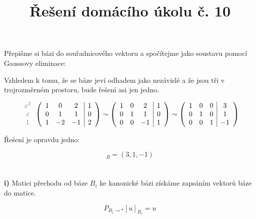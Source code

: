 \documentclass[10pt,a4paper]{article}
\title{Řešení domácího úkolu č. 10}
\date{}
\begin{document}
\maketitle

\section{} 

Přepišme si bázi do souřadnicového vektoru a spočítejme jako soustavu pomocí Gaussovy eliminace:


Vzhledem k tomu, že se báze jeví odhadem jako nezávislé a že jsou tři v trojrozměrném prostoru, bude řešení asi jen jedno.

\begin{equation*}
\color{gray}
\begin{array}{c}
x^2 \\ x \\ 1
\end{array}
\color{black}
\left(
\begin{array}{ccc|c}
1 & 0 & 2 & 1\\
0 & 1 & 1 & 0 \\
1 & -2 & -1 & 2 
\end{array}
\right)
\sim
\left(
\begin{array}{ccc|c}
1 & 0 & 2 & 1\\
0 & 1 & 1 & 0 \\
0 & 0 & -1 & 1 
\end{array}
\right)
\sim
\left(
\begin{array}{ccc|c}
1 & 0 & 0 & 3\\
0 & 1 & 0 & 1 \\
0 & 0 & 1&  -1 
\end{array}
\right)
\end{equation*}

Řešení je opravdu jedno:

\begin{equation*}
[x^2 + 2]_B = (3, 1 , -1)
\end{equation*}


\section{} %

\textbf{i)} Matici přechodu od báze $B_i$ ke kanonické bázi získáme zapsáním vektorů báze do matice.

\begin{equation*}
P_{B_i \to *}[u]_{B_i} = u
\end{equation*}
\end{document}
